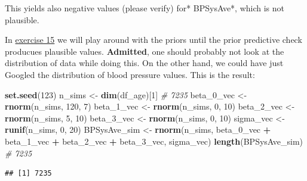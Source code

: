 \documentclass[
]{book}
\newenvironment{Shaded}{\begin{snugshade}}{\end{snugshade}}
\newcommand{\CommentTok}[1]{\textcolor[rgb]{0.56,0.35,0.01}{\textit{#1}}}
\newcommand{\DecValTok}[1]{\textcolor[rgb]{0.00,0.00,0.81}{#1}}
\newcommand{\FunctionTok}[1]{\textcolor[rgb]{0.13,0.29,0.53}{\textbf{#1}}}
\newcommand{\NormalTok}[1]{#1}
\newcommand{\OtherTok}[1]{\textcolor[rgb]{0.56,0.35,0.01}{#1}}
\newcommand{\SpecialCharTok}[1]{\textcolor[rgb]{0.81,0.36,0.00}{\textbf{#1}}}
\begin{document}
This yields also negative values (please verify) for* BPSysAve*, which is not plausible.

In \hyperref[exercise15_multiple_regression]{exercise 15} we will play around with the priors
until the prior predictive check producues plausible values.
\textbf{Admitted}, one should probably not look at the distribution of data while doing this.
On the other hand, we could have just Googled the distribution of blood pressure values.
This is the result:

\begin{Shaded}
\begin{Highlighting}[]
\FunctionTok{set.seed}\NormalTok{(}\DecValTok{123}\NormalTok{)}
\NormalTok{n\_sims }\OtherTok{\textless{}{-}} \FunctionTok{dim}\NormalTok{(df\_age)[}\DecValTok{1}\NormalTok{] }\CommentTok{\# 7235}
\NormalTok{beta\_0\_vec }\OtherTok{\textless{}{-}} \FunctionTok{rnorm}\NormalTok{(n\_sims, }\DecValTok{120}\NormalTok{, }\DecValTok{7}\NormalTok{)}
\NormalTok{beta\_1\_vec }\OtherTok{\textless{}{-}} \FunctionTok{rnorm}\NormalTok{(n\_sims, }\DecValTok{0}\NormalTok{, }\DecValTok{10}\NormalTok{)}
\NormalTok{beta\_2\_vec }\OtherTok{\textless{}{-}} \FunctionTok{rnorm}\NormalTok{(n\_sims, }\DecValTok{5}\NormalTok{, }\DecValTok{10}\NormalTok{)}
\NormalTok{beta\_3\_vec }\OtherTok{\textless{}{-}} \FunctionTok{rnorm}\NormalTok{(n\_sims, }\DecValTok{0}\NormalTok{, }\DecValTok{10}\NormalTok{)}
\NormalTok{sigma\_vec }\OtherTok{\textless{}{-}} \FunctionTok{runif}\NormalTok{(n\_sims, }\DecValTok{0}\NormalTok{, }\DecValTok{20}\NormalTok{)}
\NormalTok{BPSysAve\_sim }\OtherTok{\textless{}{-}} \FunctionTok{rnorm}\NormalTok{(n\_sims, beta\_0\_vec }\SpecialCharTok{+}\NormalTok{ beta\_1\_vec }\SpecialCharTok{+}\NormalTok{ beta\_2\_vec }\SpecialCharTok{+}\NormalTok{ beta\_3\_vec, sigma\_vec)}
\FunctionTok{length}\NormalTok{(BPSysAve\_sim) }\CommentTok{\# 7235}
\end{Highlighting}
\end{Shaded}

\begin{verbatim}
## [1] 7235
\end{verbatim}
\end{document}
